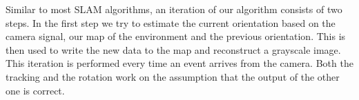Similar to most SLAM algorithms, an iteration of our algorithm consists of two steps. In the first step we try to estimate the current orientation based on the camera signal, our map of the environment and the previous orientation. This is then used to write the new data to the map and reconstruct a grayscale image. This iteration is performed every time an event arrives from the camera. Both the tracking and the rotation work on the assumption that the output  of the other one is correct.

